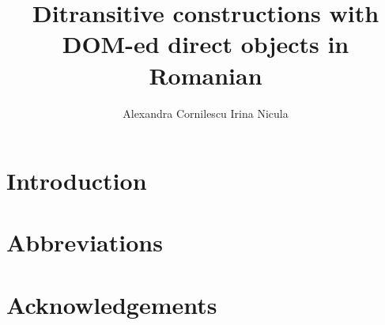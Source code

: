 \documentclass[output=paper]{langsci/langscibook}
\author{Alexandra Cornilescu\affiliation{}\lastand 
Irina Nicula\affiliation{}}
\title{Ditransitive constructions with DOM-ed direct objects in Romanian}
\begin{document}
\section{Introduction}  
 
\section*{Abbreviations}
\section*{Acknowledgements}

\sloppy
\printbibliography[heading=subbibliography,notkeyword=this] 
\end{document}
